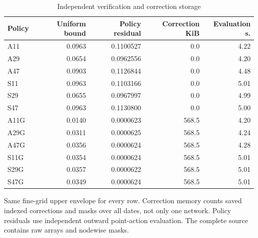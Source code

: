 \begin{table}[htbp]
\centering\small\setlength{\tabcolsep}{4pt}
\caption{Independent verification and correction storage}\label{tab:r9nestedcert}
\begin{tabular}{lrrrr}
\toprule
Policy & Uniform bound & Policy residual & Correction KiB & Evaluation s. \\
\midrule
A11 & 0.0963 & 0.1100527 & 0.0 & 4.22 \\
A29 & 0.0654 & 0.0962556 & 0.0 & 4.20 \\
A47 & 0.0903 & 0.1126844 & 0.0 & 4.48 \\
S11 & 0.0963 & 0.1103166 & 0.0 & 5.01 \\
S29 & 0.0655 & 0.0967997 & 0.0 & 4.99 \\
S47 & 0.0963 & 0.1130800 & 0.0 & 5.00 \\
A11G & 0.0140 & 0.0000623 & 568.5 & 4.20 \\
A29G & 0.0311 & 0.0000625 & 568.5 & 4.24 \\
A47G & 0.0356 & 0.0000624 & 568.5 & 4.28 \\
S11G & 0.0354 & 0.0000624 & 568.5 & 5.01 \\
S29G & 0.0357 & 0.0000622 & 568.5 & 5.01 \\
S47G & 0.0349 & 0.0000624 & 568.5 & 5.01 \\
\bottomrule
\end{tabular}
\par\vspace{3pt}\begin{minipage}{0.97\linewidth}\footnotesize Same fine-grid upper envelope for every row. Correction memory counts saved indexed corrections and masks over all dates, not only one network. Policy residuals use independent outward point-action evaluation. The complete source contains raw arrays and nodewise masks.\end{minipage}
\end{table}
